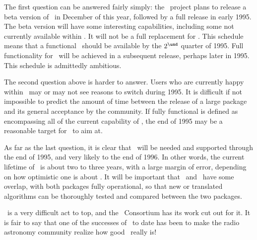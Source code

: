 The first question can be answered fairly simply:  the \AIPTOO\
project plans to release a beta version of \AIPTOO\ in December of
this year, followed by a full release in early 1995.  The beta version
will have some interesting capabilities, including some not currently
available within \AIPS.  It will not be a full replacement for \AIPS.
This schedule means that a functional \AIPTOO\ should be available by
the $2^{\und}$ quarter of 1995.  Full functionality for \AIPTOO\ will
be achieved in a subsequent release, perhaps later in 1995.  This
schedule is admittedly ambitious.

The second question above is harder to answer.  Users who are
currently happy within \AIPS\ may or may not see reasons to switch
during 1995.  It is difficult if not impossible to predict the amount
of time between the release of a large package and its general
acceptance by the community.  If fully functional is defined as
encompassing all of the current capability of \AIPS, the end of 1995
may be a reasonable target for \AIPTOO\ to aim at.

As far as the last question, it is clear that \AIPS\ will be needed
and supported through the end of 1995, and very likely to the end of
1996.  In other words, the current lifetime of \AIPS\ is about two to
three years, with a large margin of error, depending on how optimistic
one is about \AIPTOO.  It will be important that \AIPS\ and \AIPTOO\
have some overlap, with both packages fully operational, so that new
or translated algorithms can be thoroughly tested and compared
between the two packages.

\AIPS\ is a very difficult act to top, and the \AIPTOO\ Consortium has
its work cut out for it.  It is fair to say that one of the successes
of \AIPTOO\ to date has been to make the radio astronomy community
realize how good \AIPS\ really is!


